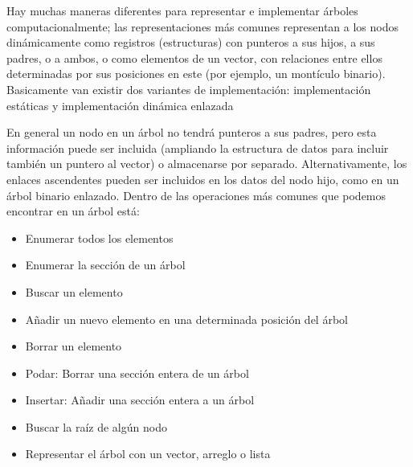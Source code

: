 Hay muchas maneras diferentes para representar e implementar árboles computacionalmente; las representaciones más comunes representan a los nodos dinámicamente como registros (estructuras) con punteros a sus hijos, a sus padres, o a ambos, o como elementos de un vector, con relaciones entre ellos determinadas por sus posiciones en este (por ejemplo, un montículo binario). Basicamente van existir dos variantes de implementación: implementación estáticas y implementación dinámica enlazada

En general un nodo en un árbol no tendrá punteros a sus padres, pero esta información puede ser incluida (ampliando la estructura de datos para incluir también un puntero al vector) o almacenarse por separado. Alternativamente, los enlaces ascendentes pueden ser incluidos en los datos del nodo hijo, como en un árbol binario enlazado. Dentro de las operaciones más comunes que podemos encontrar en un árbol está:

\begin{itemize}
	\item Enumerar todos los elementos
	\item Enumerar la sección de un árbol
	\item Buscar un elemento
	\item Añadir un nuevo elemento en una determinada posición del árbol
	\item Borrar un elemento
	\item Podar: Borrar una sección entera de un árbol
	\item Insertar: Añadir una sección entera a un árbol
	\item Buscar la raíz de algún nodo
	\item Representar el árbol con un vector, arreglo o lista
\end{itemize}

